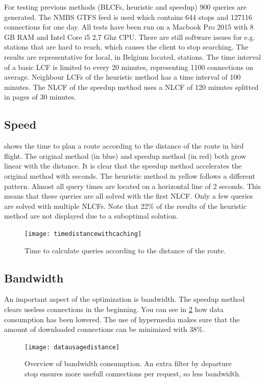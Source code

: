 \documentclass[twocolumn]{phdsymp} %
\begin{document}
For testing previous methods (BLCFs, heuristic and speedup) 900 queries are generated. The NMBS GTFS feed is used which contains 644 stops and 127116 connections for one day. All tests have been run on a Macbook Pro 2015 with 8 GB RAM and Intel Core i5 2,7 Ghz CPU. There are still software issues for e.g. stations that are hard to reach, which causes the client to stop searching. The results are representative for local, in Belgium located, stations. 
The time interval of a basic LCF is limited to every 20 minutes, representing 1100 connections on average. Neighbour LCFs of the heuristic method has a time interval of 100 minutes. The NLCF of the speedup method uses a NLCF of 120 minutes splitted in pages of 30 minutes.

\subsection{Speed}

 shows the time to plan a route according to the distance of the route in bird flight. The original method (in blue) and speedup method (in red) both grow linear with the distance. It is clear that the speedup method accelerates the original method with seconds. The heuristic method in yellow follows a different pattern. Almost all query times are located on a horizontal line of 2 seconds. This means that these queries are all solved with the first NLCF. Only a few queries are solved with multiple NLCFs. Note that 22\% of the results of the heuristic method are not displayed due to a suboptimal solution.
\begin{figure}[ht]
\begin{center}
	\texttt{[image: timedistancewithcaching]}
	\caption{\label{timedistancewithcaching}Time to calculate queries according to the distance of the route.}
\end{center}
\end{figure}

\subsection{Bandwidth}

An important aspect of the optimization is bandwidth. The speedup method clears useless connections in the beginning. You can see in \cref{datausagedistance} how data consumption has been lowered. The use of hypermedia makes sure that the amount of downloaded connections can be minimized with 38\%.
\begin{figure}[ht]
\begin{center}
	\texttt{[image: datausagedistance]}
	\caption{\label{datausagedistance}Overview of bandwidth consumption. An extra filter by departure stop ensures more usefull connections per request, so less bandwidth.}
\end{center}
\end{figure}
\end{document}
